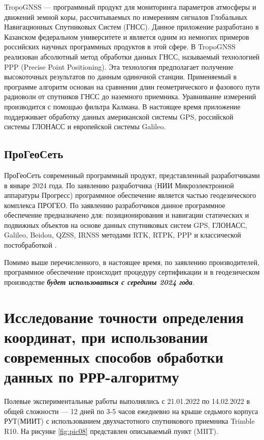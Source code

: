 TropoGNSS --- программный продукт для мониторинга параметров атмосферы и движений земной коры, рассчитываемых по измерениям сигналов Глобальных Навигационных Спутниковых Систем (ГНСС). Данное приложение разработано в Казанском федеральном университете и является одним из немногих примеров российских научных программных продуктов в этой сфере. В TropoGNSS реализован абсолютный метод обработки данных ГНСС, называемый технологией PPP (Precise Point Positioning). Эта технология предполагает получение высокоточных результатов по данным одиночной станции. Применяемый в программе алгоритм основан на сравнении длин геометрического и фазового пути радиоволн от спутников ГНСС до наземного приемника. Уравнивание измерений производится с помощью фильтра Калмана. В настоящее время приложение поддерживает обработку данных американской системы GPS, российской системы ГЛОНАСС и европейской системы Galileo.

\subsection{ПроГеоСеть}\label{subsec:ch2/sec2/sub8}

ПроГеоСеть современный программный продукт, представленный разработчиками в январе 2024 года. По заявлению разработчика (НИИ Микроэлектронной аппаратуры Прогресс) программное обеспечение является частью геодезического комплекса ПРОГЕО. По заявлению разработчиков данное программное обеспечение предназначено для: позиционирования и навигации статических и подвижных объектов на основе данных спутниковых систем GPS, ГЛОНАСС, Galileo, Beidou, QZSS, IRNSS методами RTK, RTPK, PPP и классической постобработкой \cite{src36}.

Помимо выше перечисленного, в настоящее время, по заявлению производителей, программное обеспечение происходит процедуру сертификации и в геодезическом производстве \textbf{\textit{будет использоваться с середины 2024 года}}.


\section{Исследование точности определения координат, при использовании современных способов обработки данных по РРР-алгоритму}\label{sec:ch2/sec3}

Полевые экспериментальные работы выполнялись с 21.01.2022 по 14.02.2022 в общей сложности --- 12 дней по 3-5 часов ежедневно на крыше седьмого корпуса РУТ(МИИТ) с использованием двухчастотного спутникового приемника Trimble R10. На рисунке \cref{fig:pic08} представлен описываемый пункт (MIIT).

